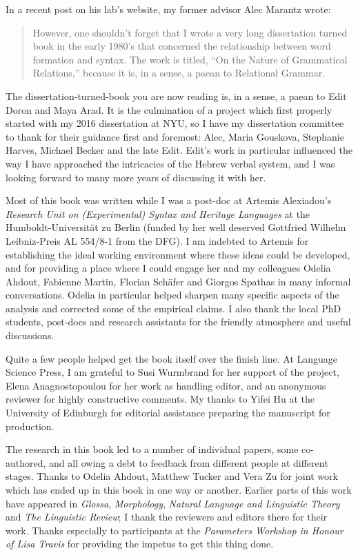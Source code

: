 \addchap{\lsAcknowledgementTitle} 

In a recent post on his lab's website, my former advisor Alec Marantz wrote:
\begin{quote}
	However, one shouldn't forget that I wrote a very long dissertation turned book in the early 1980's that concerned the relationship between word formation and syntax. The work is titled, ``On the Nature of Grammatical Relations,'' because it is, in a sense, a paean to Relational Grammar.
\end{quote}
The dissertation-turned-book you are now reading is, in a sense, a paean to Edit Doron and Maya Arad. It is the culmination of a project which first properly started with my 2016 dissertation at NYU, so I have my dissertation committee to thank for their guidance first and foremost: Alec, Maria Gouskova, Stephanie Harves, Michael Becker and the late Edit. Edit's work in particular influenced the way I have approached the intricacies of the Hebrew verbal system, and I was looking forward to many more years of discussing it with her.

Most of this book was written while I was a post-doc at Artemis Alexiadou's \emph{Research Unit on (Experimental) Syntax and Heritage Languages} at the Humboldt-Universit\"at zu Berlin (funded by her well deserved Gottfried Wilhelm Leibniz-Preis AL 554/8-1 from the DFG). I am indebted to Artemis for establishing the ideal working environment where these ideas could be developed, and for providing a place where I could engage her and my colleagues Odelia Ahdout, Fabienne Martin, Florian Sch\"afer and Giorgos Spathas in many informal conversations. Odelia in particular helped sharpen many specific aspects of the analysis and corrected some of the empirical claims. I also thank the local PhD students, post-docs and research assistants for the friendly atmosphere and useful discussions.

Quite a few people helped get the book itself over the finish line. At Language Science Press, I am grateful to Susi Wurmbrand for her support of the project, Elena Anagnostopoulou for her work as handling editor, and an anonymous reviewer for highly constructive comments. My thanks to Yifei Hu at the University of Edinburgh for editorial assistance preparing the manuscript for production.

The research in this book led to a number of individual papers, some co-authored, and all owing a debt to feedback from different people at different stages. Thanks to Odelia Ahdout, Matthew Tucker and Vera Zu for joint work which has ended up in this book in one way or another. Earlier parts of this work have appeared in \emph{Glossa}, \emph{Morphology}, \emph{Natural Language and Linguistic Theory} and \emph{The Linguistic Review}; I thank the reviewers and editors there for their work. Thanks especially to participants at the \emph{Parameters Workshop in Honour of Lisa Travis} for providing the impetus to get this thing done.

